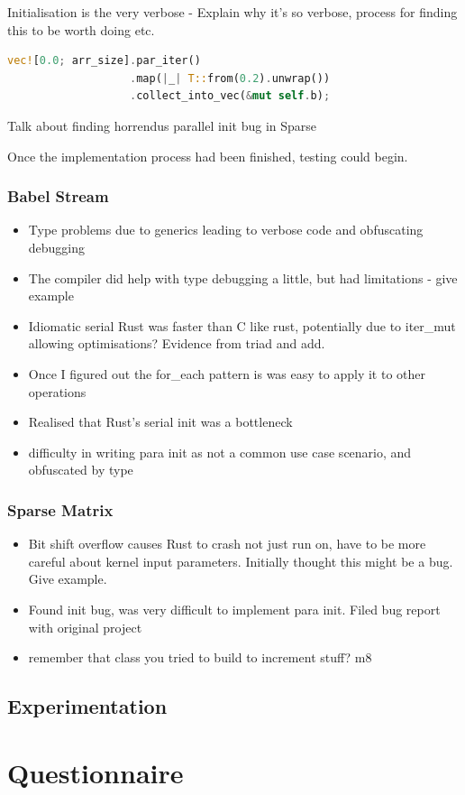 Initialisation is the very verbose - Explain why it's so verbose, process for finding this to be worth doing etc.
\begin{lstlisting}[language=Rust]
vec![0.0; arr_size].par_iter()
                   .map(|_| T::from(0.2).unwrap())
                   .collect_into_vec(&mut self.b);
\end{lstlisting}

Talk about finding horrendus parallel init bug in Sparse

Once the implementation process had been finished, testing could begin.

\subsubsection{Babel Stream}
\begin{itemize}
  \item Type problems due to generics leading to verbose code and obfuscating debugging
  \item The compiler did help with type debugging a little, but had limitations - give example
  \item Idiomatic serial Rust was faster than C like rust, potentially due to iter\_mut allowing optimisations? Evidence from triad and add.
  \item Once I figured out the for\_each pattern is was easy to apply it to other operations
  \item Realised that Rust's serial init was a bottleneck
  \item difficulty in writing para init as not a common use case scenario, and obfuscated by type
\end{itemize}








\subsubsection{Sparse Matrix}
\begin{itemize}
  \item Bit shift overflow causes Rust to crash not just run on, have to be more careful about kernel input parameters. Initially thought this might be a bug. Give example.
  \item Found init bug, was very difficult to implement para init. Filed bug report with original project
  \item remember that class you tried to build to increment stuff? m8
\end{itemize}

\subsection{Experimentation}

\section{Questionnaire}
